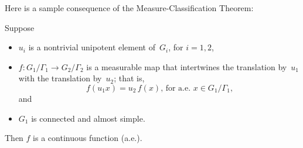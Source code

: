 Here is a sample consequence of the Measure-Classification Theorem:

\begin{cor} \label{UnipotentIsomorphismRigidity}
Suppose 
	\begin{itemize}
	\item $u_i$ is a nontrivial unipotent element of~$G_i$, for $i = 1,2$,
	\item $f \colon G_1/\Gamma_1 \to G_2/\Gamma_2$ is a measurable map that intertwines the translation by~$u_1$ with the translation by~$u_2$; that is,
		$$ \text{$f( u_1 x) = u_2 \, f(x)$, \ for a.e.\ $x \in G_1/\Gamma_1$,} $$
	and
	\item $G_1$ is connected and almost simple.
	\end{itemize}
Then $f$ is a continuous function\/ \textup(a.e.\textup).
\end{cor}

